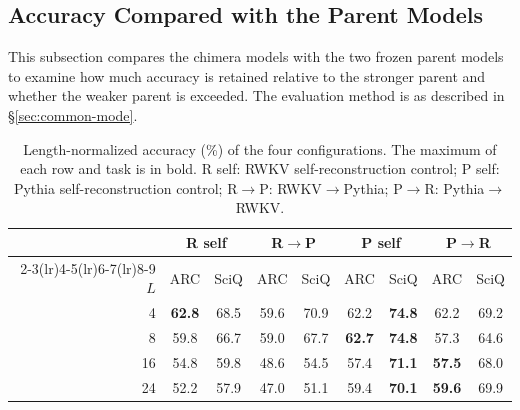 \documentclass[conference]{IEEEtran}
\begin{document}
\subsection{Accuracy Compared with the Parent Models}\label{sec:goal}
This subsection compares the chimera models with the two frozen parent models to examine how much accuracy is retained relative to
the stronger parent and whether the weaker parent is exceeded. The evaluation method is as described in \S\ref{sec:common-mode}.

\begin{table}[!t]\centering\small
\caption{Length-normalized accuracy (\%) of the four configurations. The maximum of each row and task is in bold. R self: RWKV self-reconstruction control; P self: Pythia self-reconstruction control; R$\to$P: RWKV$\to$Pythia; P$\to$R: Pythia$\to$RWKV.}\label{tab:direction}
\setlength{\tabcolsep}{2.4pt}
\begin{tabular}{rcccccccc}\toprule
& \multicolumn{2}{c}{R self} & \multicolumn{2}{c}{R$\to$P}
& \multicolumn{2}{c}{P self} & \multicolumn{2}{c}{P$\to$R}\\
\cmidrule(lr){2-3}\cmidrule(lr){4-5}\cmidrule(lr){6-7}\cmidrule(lr){8-9}
$L$ & ARC & SciQ & ARC & SciQ & ARC & SciQ & ARC & SciQ\\\midrule
4  & \textbf{62.8} & 68.5 & 59.6 & 70.9 & 62.2 & \textbf{74.8} & 62.2 & 69.2\\
8  & 59.8 & 66.7 & 59.0 & 67.7 & \textbf{62.7} & \textbf{74.8} & 57.3 & 64.6\\
16 & 54.8 & 59.8 & 48.6 & 54.5 & 57.4 & \textbf{71.1} & \textbf{57.5} & 68.0\\
24 & 52.2 & 57.9 & 47.0 & 51.1 & 59.4 & \textbf{70.1} & \textbf{59.6} & 69.9\\\bottomrule
\end{tabular}
\end{table}
\end{document}
